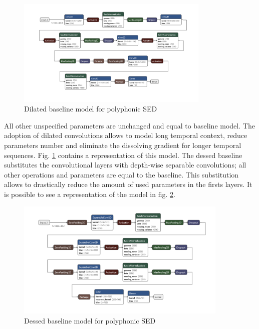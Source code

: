 \documentclass{article}
\begin{document}
\begin{figure}[H]
	\centering
	\includegraphics[width=0.82\textwidth]{./images/poly/dilated.png}	
	\caption{Dilated baseline model for polyphonic SED}
	\label{fig:poly_dilated}
\end{figure}

All other unspecified parameters are unchanged and equal to baseline model. The adoption of dilated convolutions allows to model long temporal context, reduce parameters number and eliminate the dissolving gradient for longer temporal sequences. Fig. \ref{fig:poly_dilated} contains a representation of this model.\newline
The dessed baseline substitutes the convolutional layers with depth-wise separable convolutions; all other operations and parameters are equal to the baseline. This substitution allows to drastically reduce the amount of used parameters in the firsts layers. It is possible to see a representation of the model in fig. \ref{fig:poly_dessed}.

\begin{figure}[H]
	\centering
	\includegraphics[width=0.9\textwidth]{./images/poly/dessed.png}	
	\caption{Dessed baseline model for polyphonic SED}
	\label{fig:poly_dessed}
\end{figure}
\end{document}
